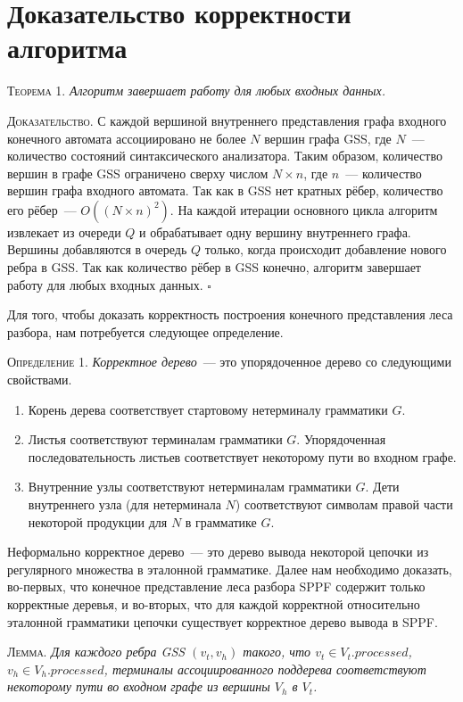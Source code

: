 \section{Доказательство корректности алгоритма}
\textsc{Теорема 1.} 
\textit{Алгоритм завершает работу для любых входных данных.}

\textsc{Доказательство.}
С каждой вершиной внутреннего представления графа входного конечного автомата ассоциировано не более $N$ вершин графа GSS, где $N$~--- количество состояний синтаксического анализатора. Таким образом, количество вершин в графе GSS ограничено сверху числом $N \times n$, где $n$~--- количество вершин графа входного автомата. Так как в GSS нет кратных рёбер, количество его рёбер~--- $O((N \times n)^{2})$. На каждой итерации основного цикла алгоритм извлекает из очереди $Q$ и обрабатывает одну вершину внутреннего графа. Вершины добавляются в очередь $Q$ только, когда происходит добавление нового ребра в GSS. Так как количество рёбер в GSS конечно, алгоритм завершает работу для любых входных данных. $\square$

Для того, чтобы доказать корректность построения конечного представления леса 
разбора, нам потребуется следующее определение. 

\textsc{Определение 1.} 
\emph{Корректное дерево}~--- это упорядоченное дерево со следующими свойствами.
\begin{enumerate}
  \item Корень дерева соответствует стартовому нетерминалу грамматики $G$.
  \item Листья соответствуют терминалам грамматики $G$. Упорядоченная последовательность листьев соответствует некоторому пути во входном графе.
  \item Внутренние узлы соответствуют нетерминалам грамматики $G$. Дети внутреннего узла (для нетерминала $N$) соответствуют символам правой части некоторой продукции для $N$ в грамматике $G$.
\end{enumerate}

Неформально корректное дерево~--- это дерево вывода некоторой цепочки из 
регулярного множества в эталонной грамматике. Далее нам необходимо доказать, 
во-первых, что конечное представление леса разбора SPPF содержит только 
корректные деревья, и во-вторых, что для каждой корректной относительно 
эталонной грамматики цепочки существует корректное дерево вывода в SPPF. 

\textsc{Лемма.}
\textit{Для каждого ребра GSS $(v_{t}, v_{h})$ такого, что $v_{t} \in V_{t}.processed$, $v_{h} \in V_{h}.processed$, терминалы ассоциированного поддерева соответствуют некоторому пути во входном графе из вершины $V_{h}$ в $V_{t}$.}

